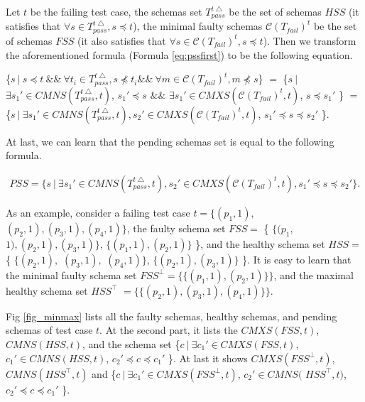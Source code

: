 {Let $t$ be the failing test case, the schemas set $T_{pass}^{t\bigtriangleup}$ be the set of schemas $HSS$ (it satisfies that $\forall s \in T_{pass}^{t\bigtriangleup}, s \preceq t $), the minimal faulty schemas $\mathcal{C}(T_{fail})^{t}$ be the set of schemas $FSS$ (it also satisfies that $\forall s \in \mathcal{C}(T_{fail})^{t}, s \preceq t $). Then we transform the aforementioned formula (Formula \ref{eq:pssfirst}) to be the following equation.

\{$s\ |\ s \preceq t\ \&\&\ \forall t_{i} \in T_{pass}^{t\bigtriangleup}, s \npreceq t_{i} \&\&\ \forall m \in \mathcal{C}(T_{fail})^{t}, m \npreceq s   $\} $=$  \{$ s\ |\ $ $\exists s_{1}' \in CMNS(T_{pass}^{t\bigtriangleup}, t)$, $s_{1}' \preceq s$  $\&\&$ $\exists s_{1}' \in CMXS(\mathcal{C}(T_{fail})^{t}, t)$, $s \preceq s_{1}'$  \} $=$  \{$ s\ |\ \exists s_{1}' \in CMNS(T_{pass}^{t\bigtriangleup}, t), s_{2}' \in CMXS(\mathcal{C}(T_{fail})^{t}, t)$, $s_{1}' \preceq s \preceq s_{2}'$ \}.

At last, we can learn that the pending schemas set is equal to the following formula.


\begin{equation}\label{eq:psssecond}
\begin{aligned}
PSS =  \{ s\ |\ \exists s_{1}' \in CMNS(T_{pass}^{t\bigtriangleup}, t), s_{2}' \in CMXS(\mathcal{C}(T_{fail})^{t}, t),  s_{1}' \preceq s \preceq s_{2}' \}.
\end{aligned}
\end{equation}


As an example, consider a failing test case $t = \{(p_{1}, 1),$ $ (p_{2}, 1), (p_{3}, 1), (p_{4}, 1)\}$, the faulty schema set $FSS =$ \{ $\{(p_{1}, $ $1), (p_{2}, 1), (p_{3}, 1)\}$, $\{(p_{1}, 1), (p_{2}, 1)\}$ \}, and the healthy schema set $HSS =$  \{ $\{(p_{2}, 1),$ $(p_{3}, 1),$ $(p_{4}, 1)\}$, $\{(p_{2}, 1), (p_{3}, 1)\}$ \}. It is easy to learn that the minimal faulty schema set $FSS^{\bot} = \{\{(p_{1}, 1), (p_{2}, 1)\}\}$, and the maximal healthy schema set $HSS^{\top}$ $= \{\{ (p_{2}, 1), (p_{3}, 1), (p_{4}, 1) \}\}$.

Fig \ref{fig_minmax} lists all the faulty schemas, healthy schemas, and pending schemas of test case $t$. At the second part, it lists the $CMXS(FSS, t)$, $CMNS(HSS, t)$, and the schema set \{$ c\ |\ \exists c_{1}' \in CMXS(FSS, t)$, $c_{1}' \in CMNS(HSS, t)$, $c_{2}' \preceq c \preceq c_{1}'$ \}. At last it shows $CMXS(FSS^{\bot}, t)$, $CMNS(HSS^{\top}, t)$ and  \{$ c\ |\ \exists c_{1}' \in CMXS(FSS^{\bot}, t)$, $ c_{2}' \in CMNS($ $HSS^{\top}, t)$, $c_{2}' \preceq c \preceq c_{1}'$ \}.


}
